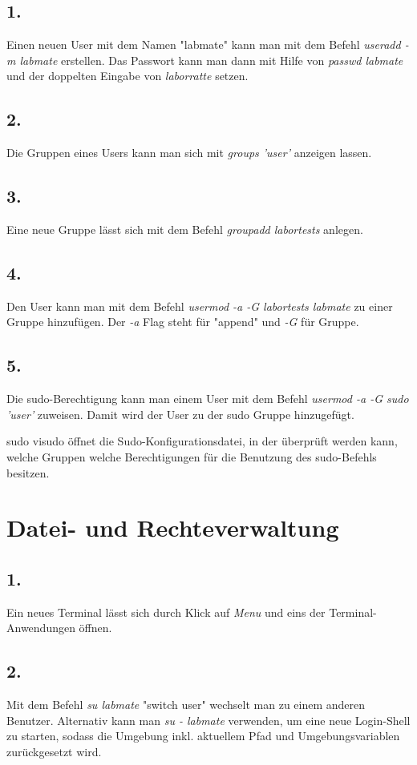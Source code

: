 \documentclass[
    fontsize=10pt,
    headings=medium,
    parskip=half,           %
    bibliography=totoc,
    numbers=noenddot,       %
    open=any,               %
    a4paper,
    ]{scrreprt}
\begin{document}
\subsection*{1.}
Einen neuen User mit dem Namen "labmate" kann man mit dem Befehl \emph{useradd -m labmate} erstellen. Das Passwort kann man dann mit Hilfe von \emph{passwd labmate} und der doppelten Eingabe von \emph{laborratte} setzen.

\subsection*{2.}
Die Gruppen eines Users kann man sich mit \emph{groups 'user'} anzeigen lassen.

\subsection*{3.}
Eine neue Gruppe lässt sich mit dem Befehl \emph{groupadd labortests} anlegen.

\subsection*{4.}
Den User kann man mit dem Befehl \emph{usermod -a -G labortests labmate} zu einer Gruppe hinzufügen. Der \emph{-a} Flag steht für "append" und \emph{-G} für Gruppe.

\subsection*{5.}
Die sudo-Berechtigung kann man einem User mit dem Befehl \emph{usermod -a -G sudo 'user'} zuweisen. Damit wird der User zu der sudo Gruppe hinzugefügt.

sudo visudo öffnet die Sudo-Konfigurationsdatei, in der überprüft werden kann, welche Gruppen welche Berechtigungen für die Benutzung des sudo-Befehls besitzen.

\section{Datei- und Rechteverwaltung}

\subsection*{1.}
Ein neues Terminal lässt sich durch Klick auf \emph{Menu} und eins der Terminal-Anwendungen öffnen.

\subsection*{2.}
Mit dem Befehl \emph{su labmate} "switch user" wechselt man zu einem anderen Benutzer. Alternativ kann man \emph{su - labmate} verwenden, um eine neue Login-Shell zu starten, sodass die Umgebung inkl. aktuellem Pfad und Umgebungsvariablen zurückgesetzt wird.
\end{document}
